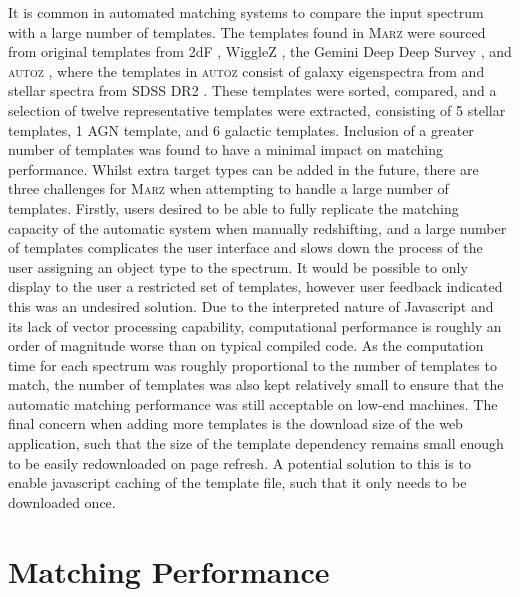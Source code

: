 \documentclass[5p]{elsarticle}
\newcommand{\autoz}{\textsc{autoz}}
\newcommand{\marz}{\textsc{Marz}}
\begin{document}
It is common in automated matching systems to compare the input spectrum with a large number of templates. The templates found in \marz{} were sourced from original templates from 2dF \citep{colless2001}, WiggleZ \citep{Drinkwater21012010}, the Gemini Deep Deep Survey \citet{abraham2004}, and \autoz{} \citep{baldry2014galaxy}, where the templates in \autoz{}  consist of galaxy eigenspectra from \citet{bolton2012} and stellar spectra from SDSS DR2 \citep{SubbaRao2002}. These templates were sorted, compared, and a selection of twelve representative templates were extracted, consisting of 5 stellar templates, 1 AGN template, and 6 galactic templates. Inclusion of a greater number of templates was found to have a minimal impact on matching performance. Whilst extra target types can be added in the future, there are three challenges for \marz{} when attempting to handle a large number of templates. Firstly, users desired to be able to fully replicate the matching capacity of the automatic system when manually redshifting, and a large number of templates complicates the user interface and slows down the process of the user assigning an object type to the spectrum. It would be possible to only display to the user a restricted set of templates, however user feedback indicated this was an undesired solution. Due to the interpreted nature of Javascript and its lack of vector processing capability, computational performance is roughly an order of magnitude worse than on typical compiled code. As the computation time for each spectrum was roughly proportional to the number of templates to match, the number of templates was also kept relatively small to ensure that the automatic matching performance was still acceptable on low-end machines. The final concern when adding more templates is the download size of the web application, such that the size of the template dependency remains small enough to be easily redownloaded on page refresh. A potential solution to this is to enable javascript caching of the template file, such that it only needs to be downloaded once.












\clearpage
\section{Matching Performance} \label{sec:perf}
\end{document}
